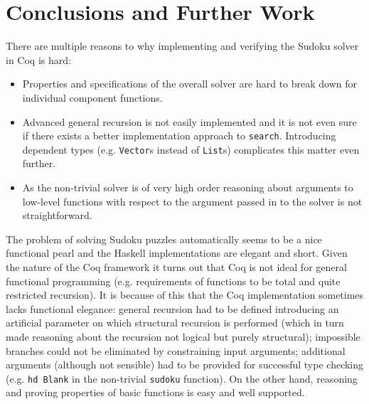 \documentclass[a4paper,11pt]{article}
\begin{document}

\section{Conclusions and Further Work}
\label{sec:conc}
There are multiple reasons to why implementing and verifying the Sudoku solver in Coq is hard:
\begin{itemize}
  \item Properties and specifications of the overall solver are hard to break down for individual component functions.
  \item Advanced general recursion is not easily implemented and it is not even sure if there exists a better implementation approach to \texttt{search}. Introducing dependent types (e.g. \texttt{Vector}s instead of \texttt{List}s) complicates this matter even further.
  \item As the non-trivial solver is of very high order reasoning about arguments to low-level functions with respect to the argument passed in to the solver is not straightforward.
\end{itemize}

The problem of solving Sudoku puzzles automatically seems to be a nice functional pearl and the Haskell implementations are elegant and short. Given the nature of the Coq framework it turns out that Coq is not ideal for general functional programming (e.g. requirements of functions to be total and quite restricted recursion). It is because of this that the Coq implementation sometimes lacks functional elegance: general recursion had to be defined introducing an artificial parameter on which structural recursion is performed (which in turn made reasoning about the recursion not logical but purely structural); impossible branches could not be eliminated by constraining input arguments; additional arguments (although not sensible) had to be provided for successful type checking (e.g. \texttt{hd Blank} in the non-trivial \texttt{sudoku} function). On the other hand, reasoning and proving properties of basic functions is easy and well supported.
\end{document}
